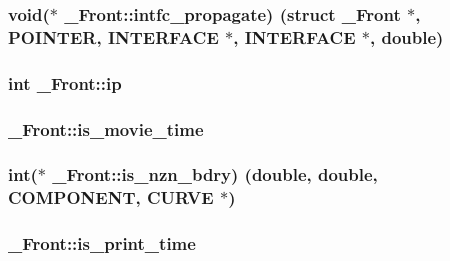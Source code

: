 \subsubsection[{\texorpdfstring{intfc\+\_\+propagate}{intfc_propagate}}]{\setlength{\rightskip}{0pt plus 5cm}void($\ast$ \+\_\+\+Front\+::intfc\+\_\+propagate) (struct {\bf \+\_\+\+Front} $\ast$, {\bf P\+O\+I\+N\+T\+ER}, {\bf I\+N\+T\+E\+R\+F\+A\+CE} $\ast$, {\bf I\+N\+T\+E\+R\+F\+A\+CE} $\ast$, double)}\hypertarget{struct___front_a393bc411f57347ed2ec50be959727388}{}\label{struct___front_a393bc411f57347ed2ec50be959727388}
\subsubsection[{\texorpdfstring{ip}{ip}}]{\setlength{\rightskip}{0pt plus 5cm}int \+\_\+\+Front\+::ip}\hypertarget{struct___front_af58fe683f72b6869872049214c65bf2e}{}\label{struct___front_af58fe683f72b6869872049214c65bf2e}
\subsubsection[{\texorpdfstring{is\+\_\+movie\+\_\+time}{is_movie_time}}]{ \+\_\+\+Front\+::is\+\_\+movie\+\_\+time}\hypertarget{struct___front_a6fed1e7240bad1bac56d78672da34e52}{}\label{struct___front_a6fed1e7240bad1bac56d78672da34e52}
\subsubsection[{\texorpdfstring{is\+\_\+nzn\+\_\+bdry}{is_nzn_bdry}}]{\setlength{\rightskip}{0pt plus 5cm}int($\ast$ \+\_\+\+Front\+::is\+\_\+nzn\+\_\+bdry) (double, double, {\bf C\+O\+M\+P\+O\+N\+E\+NT}, {\bf C\+U\+R\+VE} $\ast$)}\hypertarget{struct___front_a83555e3c0f00e8772ac68bbe64e2e552}{}\label{struct___front_a83555e3c0f00e8772ac68bbe64e2e552}
\subsubsection[{\texorpdfstring{is\+\_\+print\+\_\+time}{is_print_time}}]{ \+\_\+\+Front\+::is\+\_\+print\+\_\+time}\hypertarget{struct___front_a5181881f3b40208fae4e4e5b6499e87a}{}\label{struct___front_a5181881f3b40208fae4e4e5b6499e87a}
